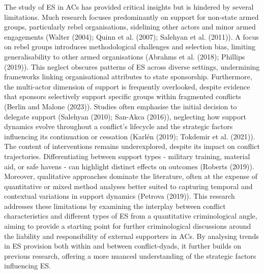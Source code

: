 \documentclass[
]{article}
\begin{document}
The study of ES in ACs has provided critical insights but is hindered by
several limitations. Much research focuses predominantly on support for
non-state armed groups, particularly rebel organisations, sidelining
other actors and minor armed engagements (Walter (2004); Quinn et al.
(2007); Salehyan et al. (2011)). A focus on rebel groups introduces
methodological challenges and selection bias, limiting generalisability
to other armed organisations (Abrahms et al. (2018); Phillips (2019)).
This neglect obscures patterns of ES across diverse settings,
undermining frameworks linking organisational attributes to state
sponsorship. Furthermore, the multi-actor dimension of support is
frequently overlooked, despite evidence that sponsors selectively
support specific groups within fragmented conflicts (Berlin and Malone
(2023)). Studies often emphasise the initial decision to delegate
support (Salehyan (2010); San-Akca (2016)), neglecting how support
dynamics evolve throughout a conflict's lifecycle and the strategic
factors influencing its continuation or cessation (Karlén (2019);
Tokdemir et al. (2021)). The content of interventions remains
underexplored, despite its impact on conflict trajectories.
Differentiating between support types - military training, material aid,
or safe havens - can highlight distinct effects on outcomes (Roberts
(2019)). Moreover, qualitative approaches dominate the literature, often
at the expense of quantitative or mixed method analyses better suited to
capturing temporal and contextual variations in support dynamics
(Petrova (2019)). This research addresses these limitations by examining
the interplay between conflict characteristics and different types of ES
from a quantitative criminological angle, aiming to provide a starting
point for further criminological discussions around the liability and
responsibility of external supporters in ACs. By analysing trends in ES
provision both within and between conflict-dyads, it further builds on
previous research, offering a more nuanced understanding of the
strategic factors influencing ES.
\end{document}
